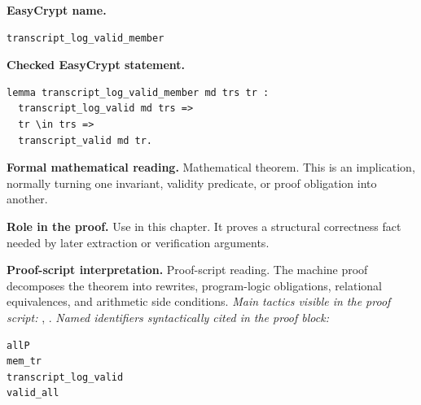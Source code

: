 \begin{formaltheorem}
\noindent\textbf{EasyCrypt name.}
\begin{lstlisting}[language=EasyCrypt,basicstyle=\ttfamily\scriptsize]
transcript_log_valid_member
\end{lstlisting}
\noindent\textbf{Checked EasyCrypt statement.}
\begin{lstlisting}[language=EasyCrypt,basicstyle=\ttfamily\scriptsize]
lemma transcript_log_valid_member md trs tr :
  transcript_log_valid md trs =>
  tr \in trs =>
  transcript_valid md tr.
\end{lstlisting}
\noindent\textbf{Formal mathematical reading.}
Mathematical theorem. This is an implication, normally turning one invariant, validity predicate, or proof obligation into another.

\noindent\textbf{Role in the proof.}
Use in this chapter. It proves a structural correctness fact needed by later extraction or verification arguments.

\noindent\textbf{Proof-script interpretation.}
Proof-script reading. The machine proof decomposes the theorem into rewrites, program-logic obligations, relational equivalences, and arithmetic side conditions.
\emph{Main tactics visible in the proof script:} , .
\emph{Named identifiers syntactically cited in the proof block:}
\begin{lstlisting}[language=EasyCrypt,basicstyle=\ttfamily\scriptsize]
allP
mem_tr
transcript_log_valid
valid_all
\end{lstlisting}

\end{formaltheorem}

